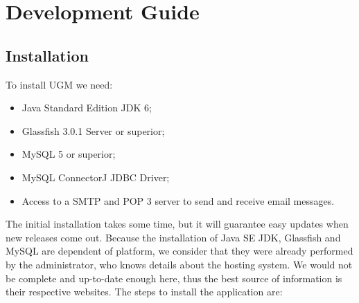 \documentclass[envcountsame,envcountchap]{svmono}
\begin{document}
\part{Development Guide}

\chapter{Installation}

To install UGM we need:

\begin{itemize}
\item Java Standard Edition JDK 6;
\item Glassfish 3.0.1 Server or superior;
\item MySQL 5 or superior;
\item MySQL ConnectorJ JDBC Driver;
\item Access to a SMTP and POP 3 server to send and receive email messages.
\end{itemize}

The initial installation takes some time, but it will guarantee easy updates when new releases come out. Because the installation of Java SE JDK, Glassfish and MySQL are dependent of platform, we consider that they were already performed by the administrator, who knows details about the hosting system. We would not be complete and up-to-date enough here, thus the best source of information is their respective websites. The steps to install the application are:
\end{document}
